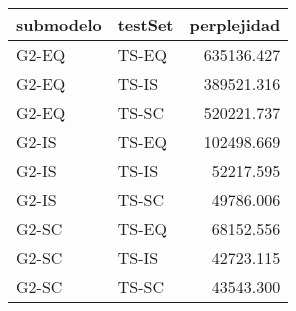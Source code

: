 \begin{tabular}{llr}
\toprule
submodelo & testSet &  perplejidad \\
\midrule
    G2-EQ &   TS-EQ &   635136.427 \\
    G2-EQ &   TS-IS &   389521.316 \\
    G2-EQ &   TS-SC &   520221.737 \\
    G2-IS &   TS-EQ &   102498.669 \\
    G2-IS &   TS-IS &    52217.595 \\
    G2-IS &   TS-SC &    49786.006 \\
    G2-SC &   TS-EQ &    68152.556 \\
    G2-SC &   TS-IS &    42723.115 \\
    G2-SC &   TS-SC &    43543.300 \\
\bottomrule
\end{tabular}
